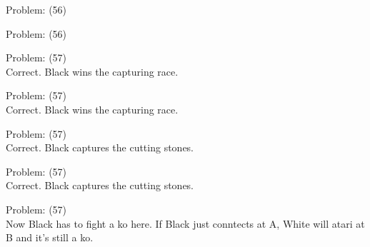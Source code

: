 \documentclass[11pt]{article}
\begin{document}
\begin{minipage}[t]{0.5\textwidth}
  {\centering
  
Problem: (56)\\
  }
\end{minipage}
\begin{minipage}[t]{0.5\textwidth}
  {\centering
  
Problem: (56)\\
  }
\end{minipage}
\begin{minipage}[t]{0.5\textwidth}
  {\centering
  
Problem: (57)\\
Correct. Black wins the capturing race.\\
  }
\end{minipage}
\begin{minipage}[t]{0.5\textwidth}
  {\centering
  
Problem: (57)\\
Correct. Black wins the capturing race.\\
  }
\end{minipage}
\begin{minipage}[t]{0.5\textwidth}
  {\centering
  
Problem: (57)\\
Correct. Black captures the cutting stones.\\
  }
\end{minipage}
\begin{minipage}[t]{0.5\textwidth}
  {\centering
  
Problem: (57)\\
Correct. Black captures the cutting stones.\\
  }
\end{minipage}
\begin{minipage}[t]{0.5\textwidth}
  {\centering
  
Problem: (57)\\
Now Black has to fight a ko here. If Black just conntects at A, White will atari at B and it's still a ko.\\
  }
\end{minipage}
\end{document}
